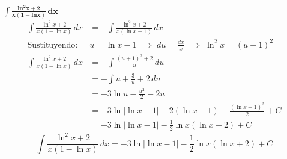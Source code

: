 $\displaystyle \mathbf{ \int 
        \frac{ln^{2}x + 2}{x \left(1 - ln x \right)}
    \,dx}$ 
\nopagebreak
\begin{align*}
\int \frac{\ln^{2}x + 2}{x \left(1 - \ln x \right)}\, dx
&= -\int \frac{\ln^{2}x + 2}{x \left(\ln x - 1\right)}\, dx \\[6pt]
\text{Sustituyendo: } &u = \ln x -1
\;\;\Rightarrow\; du = \frac{dx}{x}
\;\;\Rightarrow\; \ln^{2}x = \left(u+1\right)^{2} \\[6pt]
\int \frac{\ln^{2}x + 2}{x \left(1 - \ln x \right)}\, dx
&= -\int \frac{\left(u + 1\right)^{2} + 2}{u} \, du\\[6pt]
&= -\int u + \frac{3}{u} + 2\, du \\[6pt]
&= -3 \ln u - \frac{u^{2}}{2} - 2u \\[6pt]
&= -3 \ln\left|\ln x - 1\right| - 2 \left(\ln x - 1\right) - \frac{\left(\ln x - 1\right)^{2}}{2} + C \\[6pt]
&= -3 \ln\left|\ln x - 1\right| - \frac{1}{2} \ln x \left(\ln x + 2\right) + C
\end{align*}
\[
\boxed{\displaystyle \int
    \frac{\ln^{2}x + 2}{x \left(1 - \ln x \right)}
    \,dx 
    = -3 \ln\left|\ln x - 1\right| - \frac{1}{2} \ln x \left(\ln x + 2\right) + C
}
\]  